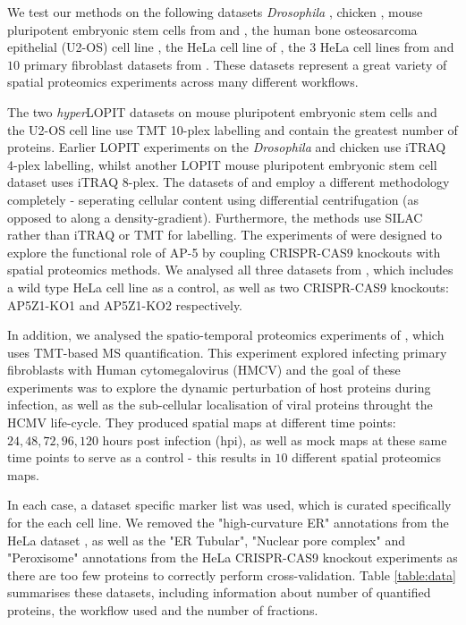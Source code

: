 \documentclass[12pt,english]{article}\usepackage[]{graphicx}\usepackage[]{color}
\begin{document}
We test our methods on the following datasets \textit{Drosophila}
\citep{Tan:2009}, chicken \citep{hall:2009}, mouse pluripotent
embryonic stem cells from \cite{hyper} and \cite{Breckels:2016}, the
human bone osteosarcoma epithelial (U2-OS) cell line
\citep{Thul:2017}, the HeLa cell line of \cite{Itzhak:2016}, the $3$
HeLa cell lines from \cite{Hirst:2018} and $10$ primary fibroblast
datasets from \cite{Jean_Beltran:2016}.  These datasets represent a
great variety of spatial proteomics experiments across many different
workflows.

The two \textit{hyper}LOPIT datasets on mouse pluripotent embryonic
stem cells and the U2-OS cell line use TMT 10-plex labelling and
contain the greatest number of proteins.  Earlier LOPIT experiments on
the \textit{Drosophila} and chicken use iTRAQ 4-plex labelling, whilst
another LOPIT mouse pluripotent embryonic stem cell dataset uses iTRAQ
8-plex. The datasets of \cite{Itzhak:2016} and \cite{Hirst:2018}
employ a different methodology completely - seperating cellular
content using differential centrifugation (as opposed to along a
density-gradient).  Furthermore, the methods use SILAC rather than
iTRAQ or TMT for labelling. The experiments of \cite{Hirst:2018} were
designed to explore the functional role of AP-5 by coupling
CRISPR-CAS9 knockouts with spatial proteomics methods. We analysed all
three datasets from \cite{Hirst:2018}, which includes a wild type HeLa
cell line as a control, as well as two CRISPR-CAS9 knockouts:
AP5Z1-KO1 and AP5Z1-KO2 respectively.

In addition, we analysed the spatio-temporal proteomics experiments of
\cite{Jean_Beltran:2016}, which uses TMT-based MS quantification. This
experiment explored infecting primary fibroblasts with Human
cytomegalovirus (HMCV) and the goal of these experiments was to
explore the dynamic perturbation of host proteins during infection, as
well as the sub-cellular localisation of viral proteins throught the
HCMV life-cycle. They produced spatial maps at different time points:
$24,48,72,96,120$ hours post infection (hpi), as well as mock maps at
these same time points to serve as a control - this results in $10$
different spatial proteomics maps.

In each case, a dataset specific marker list was used, which is
curated specifically for the each cell line. We removed the
"high-curvature ER" annotations from the HeLa dataset
\citep{Itzhak:2016}, as well as the "ER Tubular", "Nuclear pore
complex" and "Peroxisome" annotations from the HeLa CRISPR-CAS9
knockout experiments \citep{Hirst:2018} as there are too few proteins
to correctly perform cross-validation. Table \ref{table:data}
summarises these datasets, including information about number of
quantified proteins, the workflow used and the number of fractions.
\end{document}
